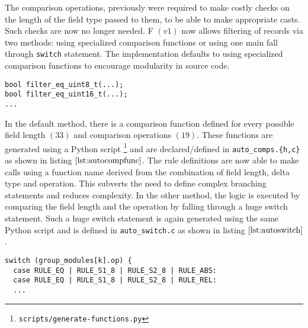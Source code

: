 The comparison operations, previously were required to make costly checks on
the length of the field type passed to them, to be able to make appropriate
casts. Such checks are now no longer needed. F $(v1)$ now allows filtering of
records via two methods: using specialized comparison functions or using one
main fall through \texttt{switch} statement. The implementation defaults to
using specialized comparison functions to encourage modularity in source code.

\begin{lstlisting}
bool filter_eq_uint8_t(...);
bool filter_eq_uint16_t(...);
...
\end{lstlisting}

In the default method, there is a comparison function defined for every
possible field length $(33)$ and comparison operations $(19)$. These functions
are generated using a Python script
\footnote{\texttt{scripts/generate-functions.py}} and are declared/defined in
\texttt{auto\_comps.\{h,c\}} as shown in listing $\ref{lst:autocompfunc}$. The
rule definitions are now able to make calls  using a function name derived from the combination of field
length, delta type and operation. This subverts the need to define complex
branching statements and reduces complexity. In the other method, the logic is
executed by comparing the field length and the operation by falling through a
huge switch statement.  Such a huge switch statement is again generated using
the same Python script and is defined in \texttt{auto\_switch.c} as shown in
listing $\ref{lst:autoswitch}$.


\begin{lstlisting}
switch (group_modules[k].op) {
  case RULE_EQ | RULE_S1_8 | RULE_S2_8 | RULE_ABS:
  case RULE_EQ | RULE_S1_8 | RULE_S2_8 | RULE_REL:
  ...
\end{lstlisting}





